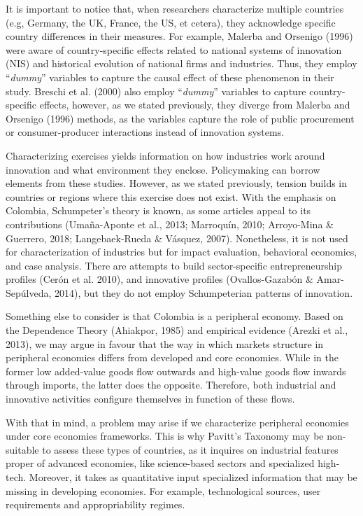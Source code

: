 \documentclass[12pt,a4paper]{article}
\begin{document}
It is important to notice that, when researchers characterize multiple countries (e.g, Germany, the UK, France, the US, et cetera), they acknowledge specific country differences in their measures. For example, Malerba and Orsenigo (1996) were aware of country-specific effects related to national systems of innovation (NIS) and historical evolution of national firms and industries. Thus, they employ “\textit{dummy}” variables to capture the causal effect of these phenomenon in their study. Breschi et al. (2000) also employ “\textit{dummy}” variables to capture country-specific effects, however, as we stated previously, they diverge from Malerba and Orsenigo (1996) methods, as the variables capture the role of public procurement or consumer-producer interactions instead of innovation systems. 

Characterizing exercises yields information on how industries work around innovation and what environment they enclose. Policymaking can borrow elements from these studies. However, as we stated previously, tension builds in countries or regions where this exercise does not exist. With the emphasis on Colombia, Schumpeter's theory is known, as some articles appeal to its contributions (Umaña-Aponte et al., 2013; Marroquín, 2010; Arroyo-Mina \& Guerrero, 2018; Langebaek-Rueda \& Vásquez, 2007). Nonetheless, it is not used for characterization of industries but for impact evaluation, behavioral economics, and case analysis. There are attempts to build sector-specific entrepreneurship profiles (Cerón et al. 2010), and innovative profiles (Ovallos-Gazabón \& Amar-Sepúlveda, 2014), but they do not employ Schumpeterian patterns of innovation.  

Something else to consider is that Colombia is a peripheral economy. Based on the Dependence Theory (Ahiakpor, 1985) and empirical evidence (Arezki et al., 2013), we may argue in favour that the way in which markets structure in peripheral economies differs from developed and core economies. While in the former low added-value goods flow outwards and high-value goods flow inwards through imports, the latter does the opposite. Therefore, both industrial and innovative activities configure themselves in function of these flows. 

With that in mind, a problem may arise if we characterize peripheral economies under core economies frameworks. This is why Pavitt’s Taxonomy may be non-suitable to assess these types of countries, as it inquires on industrial features proper of advanced economies, like science-based sectors and specialized high-tech. Moreover, it takes as quantitative input specialized information that may be missing in developing economies. For example, technological sources, user requirements and appropriability regimes. 
\end{document}

